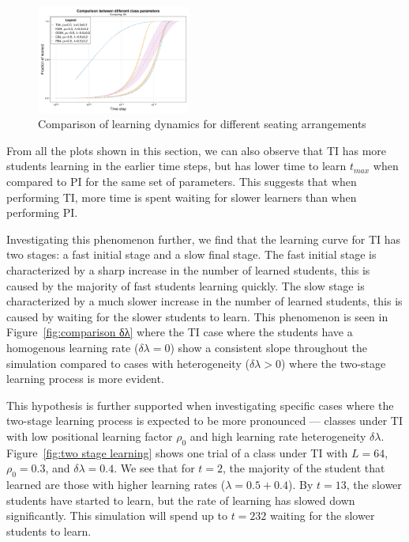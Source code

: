 \documentclass[twocolumn,secnumarabic,amssymb, nobibnotes, aps, prd]{revtex4-2}
\begin{document}
        \begin{figure}[htbp!]
            \centering
            \includegraphics[width=0.45\textwidth]{figures/2D-BPCAIH-analysis/comparison plots/SA.png}
            \caption{Comparison of learning dynamics for different seating arrangements}
            \label{fig:comparison SA}
        \end{figure}

    From all the plots shown in this section, we can also observe that TI has more students learning in the earlier time steps, but has lower time to learn $t_{max}$ when compared to PI for the same set of parameters.
    This suggests that when performing TI, more time is spent waiting for slower learners than when performing PI.

    Investigating this phenomenon further, we find that the learning curve for TI has two stages: a fast initial stage and a slow final stage.
    The fast initial stage is characterized by a sharp increase in the number of learned students, this is caused by the majority of fast students learning quickly.
    The slow stage is characterized by a much slower increase in the number of learned students, this is caused by waiting for the slower students to learn.
    This phenomenon is seen in Figure~\ref{fig:comparison δλ} where the TI case where the students have a homogenous learning rate ($\delta\lambda=0$) show a consistent slope throughout the simulation compared to cases with heterogeneity ($\delta\lambda>0$) where the two-stage learning process is more evident.

    This hypothesis is further supported when investigating specific cases where the two-stage learning process is expected to be more pronounced --- classes under TI with low positional learning factor $\rho_0$ and high learning rate heterogeneity $\delta\lambda$.
    Figure~\ref{fig:two stage learning} shows one trial of a class under TI with $L=64$, $\rho_0=0.3$, and $\delta\lambda=0.4$.
    We see that for $t=2$, the majority of the student that learned are those with higher learning rates ($\lambda=0.5+0.4$).
    By $t=13$, the slower students have started to learn, but the rate of learning has slowed down significantly.
    This simulation will spend up to $t=232$ waiting for the slower students to learn.
\end{document}
